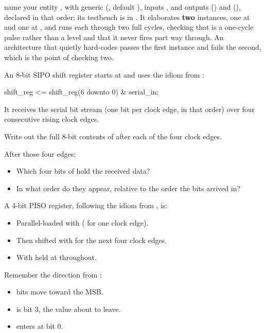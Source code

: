 
\selfcheck name your entity , with generic  (, default ), inputs ,  and outputs 
() and  (), declared in that order; its
testbench is in . It elaborates \textbf{two} instances, one at
 and one at , and runs each through two full cycles, checking that
 is a one-cycle pulse rather than a level and that it never fires part way through. An
architecture that quietly hard-codes  passes the first instance and fails the second,
which is the point of checking two.

\label{c6:set:2}

\label{c6:ex:5}
An 8-bit SIPO shift register starts at  and uses the idiom from :

\begin{vhdlcode}
shift_reg <= shift_reg(6 downto 0) & serial_in;
\end{vhdlcode}

\noindent It receives the serial bit stream  (one bit per clock edge, in that
order) over four consecutive rising clock edges.

\begin{parts}
  \item Write out the full 8-bit contents of  after each of the four clock edges.
  \item After those four edges:
    \begin{itemize}
      \item Which four bits of  hold the received data?
      \item In what order do they appear, relative to the order the bits arrived in?
    \end{itemize}
\end{parts}

\label{c6:ex:6}
A 4-bit PISO register, following the idiom from , is:
\begin{itemize}
  \item Parallel-loaded with  ( for one clock edge).
  \item Then shifted with  for the next four clock edges.
  \item With  held at  throughout.
\end{itemize}
Remember the direction from :
\begin{itemize}
  \item bits move toward the MSB.
  \item {} is bit 3, the value about to leave.
  \item {} enters at bit 0.
\end{itemize}

